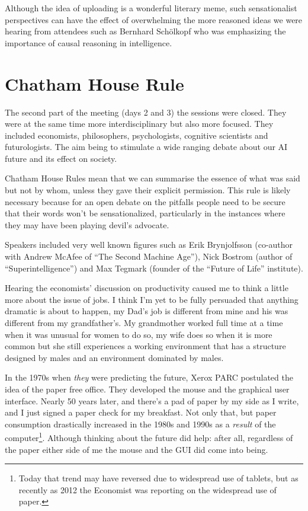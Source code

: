 \documentclass[a4paper]{caesar_book}
\begin{document}
Although the idea of uploading is a wonderful literary meme, such sensationalist perspectives can have the effect of overwhelming the more reasoned ideas we were hearing from attendees such as Bernhard Schölkopf who was emphasizing the importance of causal reasoning in intelligence.

\section{Chatham House Rule}

The second part of the meeting (days 2 and 3) the sessions were closed. They were at the same time more interdisciplinary but also more focused. They included economists, philosophers, psychologists, cognitive scientists and futurologists. The aim being to stimulate a wide ranging debate about our AI future and its effect on society.

Chatham House Rules mean that we can summarise the essence of what was said but not by whom, unless they gave their explicit permission. This rule is likely necessary because for an open debate on the pitfalls people need to be secure that their words won’t be sensationalized, particularly in the instances where they may have been playing devil’s advocate.

Speakers included very well known figures such as Erik Brynjolfsson (co-author with Andrew McAfee of “The Second Machine Age”), Nick Bostrom (author of “Superintelligence”) and Max Tegmark (founder of the “Future of Life” institute).

Hearing the economists’ discussion on productivity caused me to think a little more about the issue of jobs. I think I’m yet to be fully persuaded that anything dramatic is about to happen, my Dad’s job is different from mine and his was different from my grandfather’s. My grandmother worked full time at a time when it was unusual for women to do so, my wife does so when it is more common but she still experiences a working environment that has a structure designed by males and an environment dominated by males.

In the 1970s when \textit{they} were predicting the future, Xerox PARC postulated the idea of the paper free office. They developed the mouse and the graphical user interface. Nearly 50 years later, and there’s a pad of paper by my side as I write, and I just signed a paper check for my breakfast. Not only that, but paper consumption drastically increased in the 1980s and 1990s as a \textit{result} of the computer\footnote{Today that trend may have reversed due to widespread use of tablets, but as recently as 2012 the Economist was reporting on the widespread use of paper.}. Although thinking about the future did help: after all, regardless of the paper either side of me the mouse and the GUI did come into being.
\end{document}
